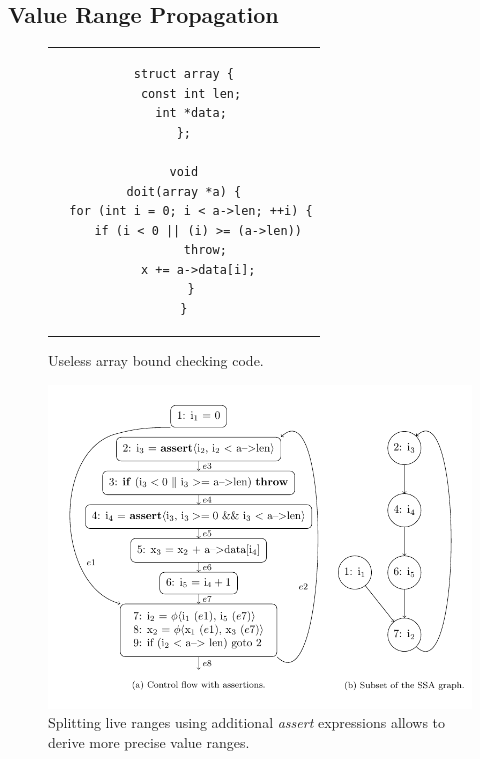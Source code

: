 \subsection{Value Range Propagation}
\label{novillo:sec:vrp}

\begin{figure}[b!]
  \begin{center}
    \begin{tabular}{c}
      \begin{lstlisting}
struct array {
  const int len;
  int *data;
};

void
doit(array *a) {
  for (int i = 0; i < a->len; ++i) {
    if (i < 0 || (i) >= (a->len))
      throw;
    x += a->data[i];
  }
}
      \end{lstlisting}
    \end{tabular}
  \end{center}
  \caption{Useless array bound checking code.}
  \label{novillo:fig:vrp-1}
\end{figure}

\begin{figure}[t!]
  \vspace{-1em}
  \begin{center}
    \includegraphics{value_range_propagation}
  \end{center}
  \vspace{-2em}
  \caption{Splitting live ranges using additional \emph{assert} expressions
           allows to derive more precise value ranges.}
  \subfigure{\label{novillo:fig:vrp-2:a}}
  \subfigure{\label{novillo:fig:vrp-2:b}}
  \label{novillo:fig:vrp-2}
\end{figure}

